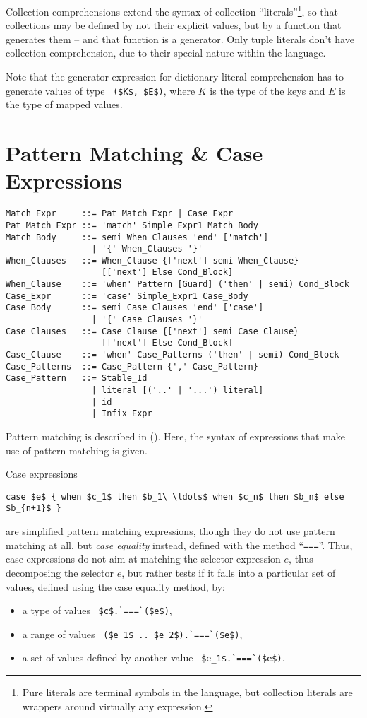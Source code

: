 Collection comprehensions extend the syntax of collection ``literals''\footnote{Pure literals are terminal symbols in the language, but collection literals are wrappers around virtually any expression.}, so that collections may be defined by not their explicit values, but by a function that generates them -- and that function is a generator. Only tuple literals don't have collection comprehension, due to their special nature within the language. 

Note that the generator expression for dictionary literal comprehension has to generate values of type ~\lstinline!($K$, $E$)!, where $K$ is the type of the keys and $E$ is the type of mapped values. 






\section{Pattern Matching \& Case Expressions}

\syntax\begin{lstlisting}
Match_Expr     ::= Pat_Match_Expr | Case_Expr
Pat_Match_Expr ::= 'match' Simple_Expr1 Match_Body
Match_Body     ::= semi When_Clauses 'end' ['match']
                 | '{' When_Clauses '}'
When_Clauses   ::= When_Clause {['next'] semi When_Clause} 
                   [['next'] Else Cond_Block]
When_Clause    ::= 'when' Pattern [Guard] ('then' | semi) Cond_Block
Case_Expr      ::= 'case' Simple_Expr1 Case_Body
Case_Body      ::= semi Case_Clauses 'end' ['case']
                 | '{' Case_Clauses '}'
Case_Clauses   ::= Case_Clause {['next'] semi Case_Clause}
                   [['next'] Else Cond_Block]
Case_Clause    ::= 'when' Case_Patterns ('then' | semi) Cond_Block
Case_Patterns  ::= Case_Pattern {',' Case_Pattern}
Case_Pattern   ::= Stable_Id
                 | literal [('..' | '...') literal]
                 | id
                 | Infix_Expr
\end{lstlisting}

Pattern matching is described in (). Here, the syntax of expressions that make use of pattern matching is given. 

Case expressions 
\begin{lstlisting}
case $e$ { when $c_1$ then $b_1\ \ldots$ when $c_n$ then $b_n$ else $b_{n+1}$ }
\end{lstlisting}
are simplified pattern matching expressions, though they do not use pattern matching at all, but {\em case equality} instead, defined with the method ``\lstinline!===!''. Thus, case expressions do not aim at matching the selector expression $e$, thus decomposing the selector $e$, but rather tests if it falls into a particular set of values, defined using the case equality method, by:
\begin{itemize}
\item a type of values ~\lstinline!$c$.`===`($e$)!,
\item a range of values ~\lstinline!($e_1$ .. $e_2$).`===`($e$)!, 
\item a set of values defined by another value ~\lstinline!$e_1$.`===`($e$)!.
\end{itemize}

